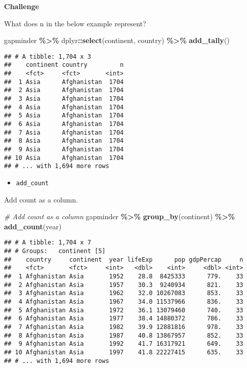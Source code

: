 \documentclass[
]{book}
\newenvironment{Shaded}{\begin{snugshade}}{\end{snugshade}}
\newcommand{\CommentTok}[1]{\textcolor[rgb]{0.56,0.35,0.01}{\textit{#1}}}
\newcommand{\KeywordTok}[1]{\textcolor[rgb]{0.13,0.29,0.53}{\textbf{#1}}}
\newcommand{\NormalTok}[1]{#1}
\newcommand{\OperatorTok}[1]{\textcolor[rgb]{0.81,0.36,0.00}{\textbf{#1}}}
\newcommand{\StringTok}[1]{\textcolor[rgb]{0.31,0.60,0.02}{#1}}
\providecommand{\tightlist}{%
  \setlength{\itemsep}{0pt}\setlength{\parskip}{0pt}}
\begin{document}
\textbf{Challenge}

What does n in the below example represent?

\begin{Shaded}
\begin{Highlighting}[]
\NormalTok{gapminder }\OperatorTok{\%\textgreater{}\%}
\StringTok{  }\NormalTok{dplyr}\OperatorTok{::}\KeywordTok{select}\NormalTok{(continent, country) }\OperatorTok{\%\textgreater{}\%}
\StringTok{  }\KeywordTok{add\_tally}\NormalTok{()}
\end{Highlighting}
\end{Shaded}

\begin{verbatim}
## # A tibble: 1,704 x 3
##    continent country         n
##    <fct>     <fct>       <int>
##  1 Asia      Afghanistan  1704
##  2 Asia      Afghanistan  1704
##  3 Asia      Afghanistan  1704
##  4 Asia      Afghanistan  1704
##  5 Asia      Afghanistan  1704
##  6 Asia      Afghanistan  1704
##  7 Asia      Afghanistan  1704
##  8 Asia      Afghanistan  1704
##  9 Asia      Afghanistan  1704
## 10 Asia      Afghanistan  1704
## # ... with 1,694 more rows
\end{verbatim}

\begin{itemize}
\tightlist
\item
  \texttt{add\_count}
\end{itemize}

Add count as a column.

\begin{Shaded}
\begin{Highlighting}[]
\CommentTok{\# Add count as a column}
\NormalTok{gapminder }\OperatorTok{\%\textgreater{}\%}
\StringTok{  }\KeywordTok{group\_by}\NormalTok{(continent) }\OperatorTok{\%\textgreater{}\%}
\StringTok{  }\KeywordTok{add\_count}\NormalTok{(year)}
\end{Highlighting}
\end{Shaded}

\begin{verbatim}
## # A tibble: 1,704 x 7
## # Groups:   continent [5]
##    country     continent  year lifeExp      pop gdpPercap     n
##    <fct>       <fct>     <int>   <dbl>    <int>     <dbl> <int>
##  1 Afghanistan Asia       1952    28.8  8425333      779.    33
##  2 Afghanistan Asia       1957    30.3  9240934      821.    33
##  3 Afghanistan Asia       1962    32.0 10267083      853.    33
##  4 Afghanistan Asia       1967    34.0 11537966      836.    33
##  5 Afghanistan Asia       1972    36.1 13079460      740.    33
##  6 Afghanistan Asia       1977    38.4 14880372      786.    33
##  7 Afghanistan Asia       1982    39.9 12881816      978.    33
##  8 Afghanistan Asia       1987    40.8 13867957      852.    33
##  9 Afghanistan Asia       1992    41.7 16317921      649.    33
## 10 Afghanistan Asia       1997    41.8 22227415      635.    33
## # ... with 1,694 more rows
\end{verbatim}
\end{document}
